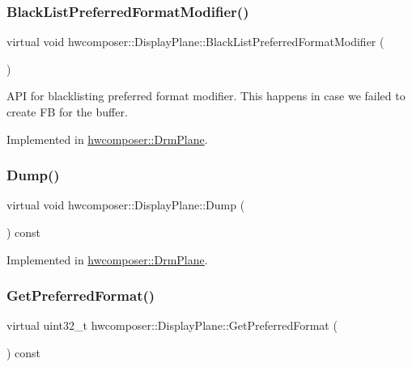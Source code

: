 \subsubsection{\texorpdfstring{Black\+List\+Preferred\+Format\+Modifier()}{BlackListPreferredFormatModifier()}}
{\footnotesize\ttfamily virtual void hwcomposer\+::\+Display\+Plane\+::\+Black\+List\+Preferred\+Format\+Modifier (\begin{DoxyParamCaption}{ }\end{DoxyParamCaption})\hspace{0.3cm}{\ttfamily [pure virtual]}}

A\+PI for blacklisting preferred format modifier. This happens in case we failed to create FB for the buffer. 

Implemented in \mbox{\hyperlink{classhwcomposer_1_1DrmPlane_a6159712388e26258e14fcb3139d7cd19}{hwcomposer\+::\+Drm\+Plane}}.

\mbox{\label{classhwcomposer_1_1DisplayPlane_a3754165ab1101fba4229b842c7f14556}} 
\subsubsection{\texorpdfstring{Dump()}{Dump()}}
{\footnotesize\ttfamily virtual void hwcomposer\+::\+Display\+Plane\+::\+Dump (\begin{DoxyParamCaption}{ }\end{DoxyParamCaption}) const\hspace{0.3cm}{\ttfamily [pure virtual]}}



Implemented in \mbox{\hyperlink{classhwcomposer_1_1DrmPlane_abc9ca4823dfd433aa45747b8596cc673}{hwcomposer\+::\+Drm\+Plane}}.

\mbox{\label{classhwcomposer_1_1DisplayPlane_a963d17ec10be62d13f35a0b4ced4e8e1}} 
\subsubsection{\texorpdfstring{Get\+Preferred\+Format()}{GetPreferredFormat()}}
{\footnotesize\ttfamily virtual uint32\+\_\+t hwcomposer\+::\+Display\+Plane\+::\+Get\+Preferred\+Format (\begin{DoxyParamCaption}{ }\end{DoxyParamCaption}) const\hspace{0.3cm}{\ttfamily [pure virtual]}}


